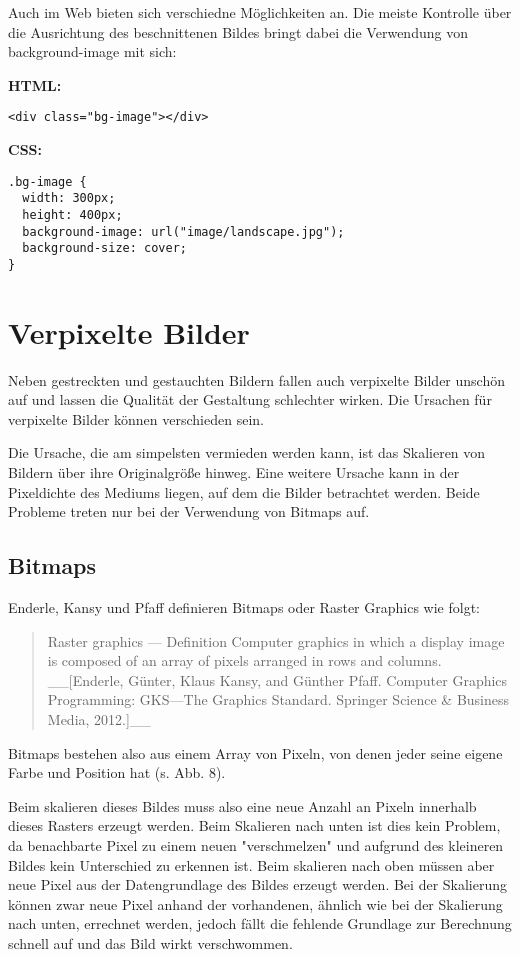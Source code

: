 Auch im Web bieten sich verschiedne Möglichkeiten an.
Die meiste Kontrolle über die Ausrichtung des beschnittenen Bildes bringt dabei die Verwendung von background-image mit sich:

\textbf{HTML:}
\begin{lstlisting}
<div class="bg-image"></div>
\end{lstlisting}

\textbf{CSS:}
\begin{lstlisting}
.bg-image {
  width: 300px;
  height: 400px;
  background-image: url("image/landscape.jpg");
  background-size: cover;
}
\end{lstlisting}

\section{Verpixelte Bilder}
Neben gestreckten und gestauchten Bildern fallen auch verpixelte Bilder unschön auf und lassen die Qualität der Gestaltung schlechter wirken. Die Ursachen für verpixelte Bilder können verschieden sein.

Die Ursache, die am simpelsten vermieden werden kann, ist das Skalieren von Bildern über ihre Originalgröße hinweg. Eine weitere Ursache kann in der Pixeldichte des Mediums liegen, auf dem die Bilder betrachtet werden.
Beide Probleme treten nur bei der Verwendung von Bitmaps auf.

\subsection{Bitmaps}
Enderle, Kansy und Pfaff definieren Bitmaps oder Raster Graphics wie folgt:

\begin{quote}
Raster graphics — Definition
Computer graphics in which a display image is composed of an array of pixels arranged in rows and columns. __[Enderle, Günter, Klaus Kansy, and Günther Pfaff. Computer Graphics Programming: GKS—The Graphics Standard. Springer Science & Business Media, 2012.]__
\end{quote}

Bitmaps bestehen also aus einem Array von Pixeln, von denen jeder seine eigene Farbe und Position hat (s. Abb. 8).


Beim skalieren dieses Bildes muss also eine neue Anzahl an Pixeln innerhalb dieses Rasters erzeugt werden. Beim Skalieren nach unten ist dies kein Problem, da benachbarte Pixel zu einem neuen "verschmelzen" und aufgrund des kleineren Bildes kein Unterschied zu erkennen ist.
Beim skalieren nach oben müssen aber neue Pixel aus der Datengrundlage des Bildes erzeugt werden. Bei der Skalierung können zwar neue Pixel anhand der vorhandenen, ähnlich wie bei der Skalierung nach unten, errechnet werden, jedoch fällt die fehlende Grundlage zur Berechnung schnell auf und das Bild wirkt verschwommen.

